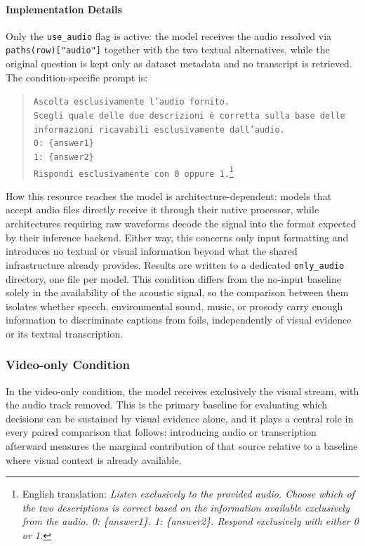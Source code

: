 \paragraph{Implementation Details}
Only the \texttt{use\_audio} flag is active: the model receives the audio resolved via \texttt{paths(row)["audio"]} together with the two textual alternatives, while the original question is kept only as dataset metadata and no transcript is retrieved. The condition-specific prompt is:
\begin{quote}
\small
\texttt{Ascolta esclusivamente l'audio fornito.}\\
\texttt{Scegli quale delle due descrizioni è corretta sulla base delle}\\
\texttt{informazioni ricavabili esclusivamente dall'audio.}\\[0.5em]
\texttt{0: \{answer1\}}\\
\texttt{1: \{answer2\}}\\[0.5em]
\texttt{Rispondi esclusivamente con 0 oppure 1.}\footnote{English translation: \textit{Listen exclusively to the provided audio. Choose which of the two descriptions is correct based on the information available exclusively from the audio. 0: \{answer1\}. 1: \{answer2\}. Respond exclusively with either 0 or 1.}}
\end{quote}
How this resource reaches the model is architecture-dependent: models that accept audio files directly receive it through their native processor, while architectures requiring raw waveforms decode the signal into the format expected by their inference backend. Either way, this concerns only input formatting and introduces no textual or visual information beyond what the shared infrastructure already provides.
Results are written to a dedicated \texttt{only\_audio} directory, one file per model. This condition differs from the no-input baseline solely in the availability of the acoustic signal, so the comparison between them isolates whether speech, environmental sound, music, or prosody carry enough information to discriminate captions from foils, independently of visual evidence or its textual transcription.
\subsubsection*{Video-only Condition}
In the video-only condition, the model receives exclusively the visual stream, with the audio track removed. This is the primary baseline for evaluating which decisions can be sustained by visual evidence alone, and it plays a central role in every paired comparison that follows: introducing audio or transcription afterward measures the marginal contribution of that source relative to a baseline where visual context is already available.
